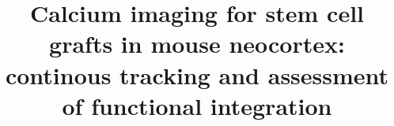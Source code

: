 \title{Calcium imaging for stem cell grafts in mouse neocortex: continous tracking and assessment of functional integration}